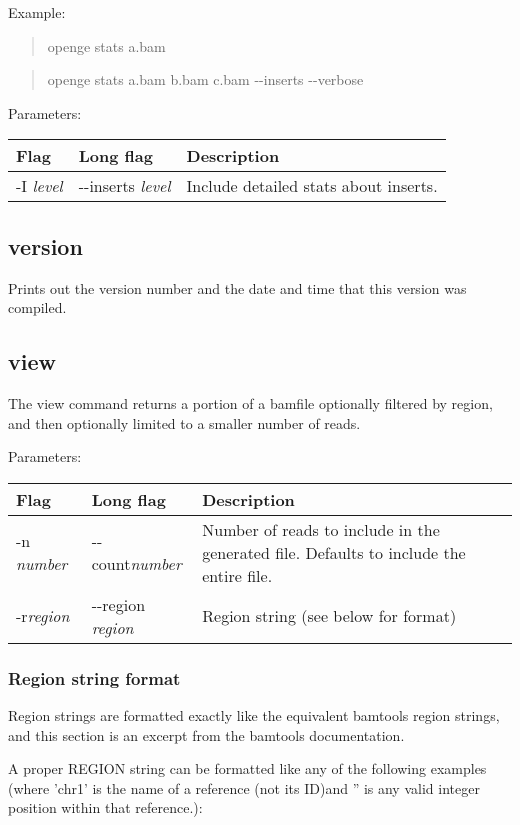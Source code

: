 \documentclass[11pt]{article}
\newcommand {\cmd}[1] {\begin{quote}#1\end{quote}}
\begin{document}
Example:

\cmd{openge stats a.bam}
\cmd{openge stats a.bam b.bam c.bam {-}{-}inserts {-}{-}verbose}
Parameters:
\begin{center}
\begin{tabular}{llp{3.5in}}
\hline
Flag&Long flag&Description\\ \hline
-I \textit{level}&{-}{-}inserts \textit{level}&Include detailed stats about inserts.\\
\end{tabular}
\end{center}

\subsection{version}
Prints out the version number and the date and time that this version was compiled.

\subsection{view}
The view command returns a portion of a bamfile optionally filtered by region, and then optionally limited to a smaller number of reads.

Parameters:
\begin{center}
\begin{tabular}{llp{3.5in}}
\hline
Flag&Long flag&Description\\ \hline
-n \textit{number}&{-}{-}count\textit{number}&Number of reads to include in the generated file. Defaults to include the entire file.\\
-r\textit{region}&{-}{-}region \textit{region}&Region string (see below for format)\\
\end{tabular}
\end{center}

\subsubsection{Region string format}
Region strings are formatted exactly like the equivalent bamtools region strings, and this section is an excerpt from the bamtools documentation.

A proper REGION string can be formatted like any of the following examples (where 'chr1' is the name of a reference (not its ID)and '' is any valid integer position within that reference.):
\end{document}
